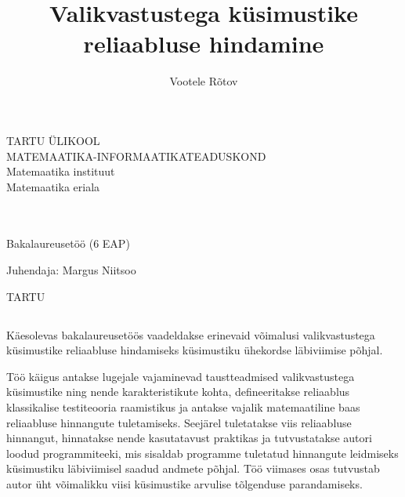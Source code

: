 \documentclass[a4paper,12pt,oneside]{article}
\author{Vootele Rõtov}
\title{Valikvastustega küsimustike reliaabluse hindamine}
\newcommand{\nocontentsline}[3]{}
\newcommand{\tocless}[2]{\bgroup\let\addcontentsline=\nocontentsline#1{#2}\egroup}
\numberwithin{equation}{section}
\theoremstyle{definition}
\begin{document}
\makeatletter
\begin{titlepage}
\begin{center}

{\large TARTU ÜLIKOOL}\\[0.3cm]
{\large MATEMAATIKA-INFORMAATIKATEADUSKOND}\\[0.3cm]
{\large Matemaatika instituut}\\[0.3cm]
{\large Matemaatika eriala} %

\vfill
{\large \@author}\\[0.3cm]
{\huge \textbf{\@title}}\\[0.3cm]
{\large Bakalaureusetöö (6 EAP)} %

\vfill

\begin{flushright}
{\large Juhendaja: Margus Niitsoo}
\end{flushright}
 

\vfill

{\large TARTU \the\year}

\end{center}
\end{titlepage}
\makeatother

\pagebreak

\makeatletter
\tocless{\subsection*{\@title}}

\tocless{\subsubsection*{\@author}}

\tocless{\subsubsection*{Lühikokkuvõte}}

\makeatother

Käesolevas bakalaureusetöös vaadeldakse erinevaid võimalusi valikvastustega kü\-si\-mus\-tike reliaabluse hindamiseks küsimustiku ühekordse läbiviimise põhjal. 

Töö käigus antakse lugejale vajaminevad taustteadmised valikvastustega küsimus\-tike ning nende karakteristikute kohta, defineeritakse reliaablus klassikalise testiteooria raamistikus ja antakse vajalik matemaatiline baas reliaabluse hinnangute tuletamiseks. Seejärel tuletatakse viis reliaabluse hinnangut, hinnatakse nende \linebreak kasutatavust praktikas ja tutvustatakse autori loodud programmiteeki, mis sisaldab programme tuletatud hinnangute leidmiseks küsimustiku läbiviimisel saadud \linebreak andmete põhjal. Töö viimases osas tutvustab autor üht võimalikku viisi küsimustike arvulise tõlgenduse parandamiseks.
\end{document}
